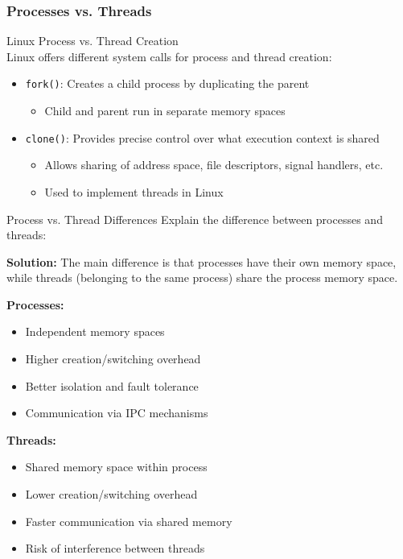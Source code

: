 \subsubsection{Processes vs. Threads}

\begin{theorem}{Linux Process vs. Thread Creation}\\
    Linux offers different system calls for process and thread creation:
    \begin{itemize}
        \item \texttt{fork()}: Creates a child process by duplicating the parent
            \begin{itemize}
                \item Child and parent run in separate memory spaces
            \end{itemize}
        \item \texttt{clone()}: Provides precise control over what execution context is shared
            \begin{itemize}
                \item Allows sharing of address space, file descriptors, signal handlers, etc.
                \item Used to implement threads in Linux
            \end{itemize}
    \end{itemize}
\end{theorem}

\begin{example2}{Process vs. Thread Differences}
    Explain the difference between processes and threads:
    
    \tcblower
    
    \textbf{Solution:}
    The main difference is that processes have their own memory space, while threads (belonging to the same process) share the process memory space.
    
    \begin{minipage}{0.5\linewidth}
    \textbf{Processes:}
    \begin{itemize}
        \item Independent memory spaces
        \item Higher creation/switching overhead
        \item Better isolation and fault tolerance
        \item Communication via IPC mechanisms
    \end{itemize}
    \end{minipage}%
    \begin{minipage}{0.5\linewidth}    
    \textbf{Threads:}
    \begin{itemize}
        \item Shared memory space within process
        \item Lower creation/switching overhead
        \item Faster communication via shared memory
        \item Risk of interference between threads
    \end{itemize}
    \end{minipage}
\end{example2}

